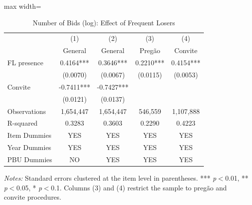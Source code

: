 \begin{table}[htbp]
\centering
\caption{Number of Bids (log): Effect of Frequent Losers}
\label{tab:nbids}
\begin{adjustbox}{max width=\textwidth}
\begin{threeparttable}
\small
\begin{tabular}{lcccc}
\toprule
 & (1) & (2) & (3) & (4) \\
 & General & General & Preg\~{a}o & Convite \\
\midrule
FL presence & 0.4164*** & 0.3646*** & 0.2210*** & 0.4154*** \\
 & (0.0070) & (0.0067) & (0.0115) & (0.0053) \\
Convite & -0.7411*** & -0.7427*** &  &  \\
 & (0.0121) & (0.0137) &  &  \\
\midrule
Observations & 1,654,447 & 1,654,447 & 546,559 & 1,107,888 \\
R-squared & 0.3283 & 0.3603 & 0.2290 & 0.4223 \\
Item Dummies & YES & YES & YES & YES \\
Year Dummies & YES & YES & YES & YES \\
PBU Dummies & NO & YES & YES & YES \\
\bottomrule
\end{tabular}
\begin{tablenotes}
\small
\item \textit{Notes:} Standard errors clustered at the item level in parentheses. *** \textit{p}$<$0.01, ** \textit{p}$<$0.05, * \textit{p}$<$0.1. Columns (3) and (4) restrict the sample to preg\~{a}o and convite procedures.
\end{tablenotes}
\end{threeparttable}
\end{adjustbox}
\end{table}
